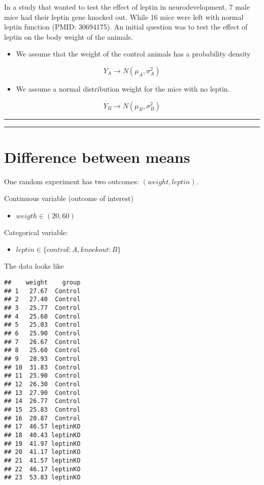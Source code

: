 \documentclass[
]{book}
\providecommand{\tightlist}{%
  \setlength{\itemsep}{0pt}\setlength{\parskip}{0pt}}
\begin{document}
In a study that wanted to test the effect of leptin in neurodevelopment, 7 male mice had their leptin gene knocked out. While 16 mice were left with normal leptin function (PMID: 30694175). An initial question was to test the effect of leptin on the body weight of the animals.

\begin{itemize}
\tightlist
\item
  We assume that the weight of the control animals has a probability density
\end{itemize}

\[Y_A \rightarrow N(\mu_A, \sigma_A^2)\]

\begin{itemize}
\tightlist
\item
  We assume a normal distribution weight for the mice with no leptin.
\end{itemize}

\[Y_B \rightarrow N(\mu_B, \sigma_B^2)\]

\begin{center}\rule{0.5\linewidth}{0.5pt}\end{center}

\begin{center}\rule{0.5\linewidth}{0.5pt}\end{center}

\hypertarget{difference-between-means-5}{%
\section{Difference between means}\label{difference-between-means-5}}

One random experiment has two outcomes: \((weight, leptin)\).

Continuous variable (outcome of interest)

\begin{itemize}
\tightlist
\item
  \(weigth \in (20, 60)\)
\end{itemize}

Categorical variable:

\begin{itemize}
\tightlist
\item
  \(leptin \in \{control:A,knockout:B\}\)
\end{itemize}

The data looks like

\begin{verbatim}
##    weight    group
## 1   27.67  Control
## 2   27.40  Control
## 3   25.77  Control
## 4   25.60  Control
## 5   25.03  Control
## 6   25.90  Control
## 7   26.67  Control
## 8   25.60  Control
## 9   28.93  Control
## 10  31.83  Control
## 11  25.90  Control
## 12  26.30  Control
## 13  27.90  Control
## 14  26.77  Control
## 15  25.83  Control
## 16  20.87  Control
## 17  46.57 leptinKO
## 18  40.43 leptinKO
## 19  41.97 leptinKO
## 20  41.17 leptinKO
## 21  41.57 leptinKO
## 22  46.17 leptinKO
## 23  53.83 leptinKO
\end{verbatim}
\end{document}
